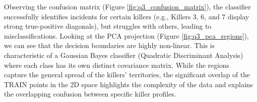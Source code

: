 \documentclass{article}
\begin{document}
Observing the confusion matrix (Figure \ref{fig:q3_confusion_matrix}), the classifier successfully identifies incidents for certain killers (e.g., Killers 3, 6, and 7 display strong true-positive diagonals), but struggles with others, leading to misclassifications. Looking at the PCA projection (Figure \ref{fig:q3_pca_regions}), we can see that the decision boundaries are highly non-linear. This is characteristic of a Gaussian Bayes classifier (Quadratic Discriminant Analysis) where each class has its own distinct covariance matrix. While the regions capture the general spread of the killers' territories, the significant overlap of the TRAIN points in the 2D space highlights the complexity of the data and explains the overlapping confusion between specific killer profiles.

\end{document}
